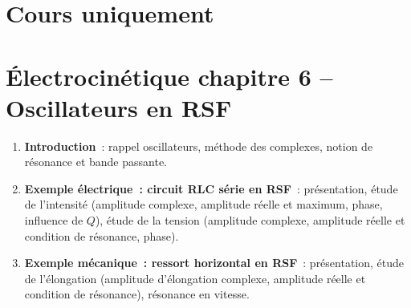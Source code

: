 \documentclass[a4paper, 12pt, final, garamond]{book}
\begin{document}
\section{Cours uniquement}
\section*{Électrocinétique chapitre 6 -- Oscillateurs en RSF}
\begin{enumerate}[label=\Roman*]
    \item \textbf{Introduction}~: rappel oscillateurs, méthode des complexes,
        notion de résonance et bande passante.
    \item \textbf{Exemple électrique~: circuit RLC série en RSF}~: présentation,
        étude de l'intensité (amplitude complexe, amplitude réelle et maximum,
        phase, influence de $Q$), étude de la tension (amplitude complexe,
        amplitude réelle et condition de résonance, phase).
    \item \textbf{Exemple mécanique~: ressort horizontal en RSF}~: présentation,
        étude de l'élongation (amplitude d'élongation complexe, amplitude réelle
        et condition de résonance), résonance en vitesse.
\end{enumerate}
\end{document}
